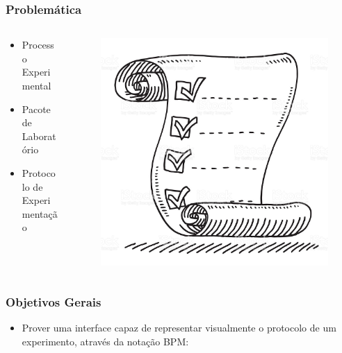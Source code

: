 \documentclass[aspectratio=169]{beamer}
\begin{document}
\begin{frame}
\frametitle{Problemática}
\justifying

\begin{columns}

\begin{column}{0.5\textwidth}

\begin{itemize}
\item Processo Experimental
\item Pacote de Laboratório
\item Protocolo de Experimentação
\end{itemize}

\end{column}

\begin{column}{0.5\textwidth}
\begin{figure}
\centering
\includegraphics[scale=0.2]{images/paper.jpg}
\end{figure}
\end{column}
\end{columns}



\end{frame}

\begin{frame}
\frametitle{Objetivos Gerais}
\justifying

\begin{itemize}
\item Prover uma interface capaz de representar visualmente o protocolo de um experimento, através da notação BPM:
\end{itemize}
\end{frame}
\end{document}
